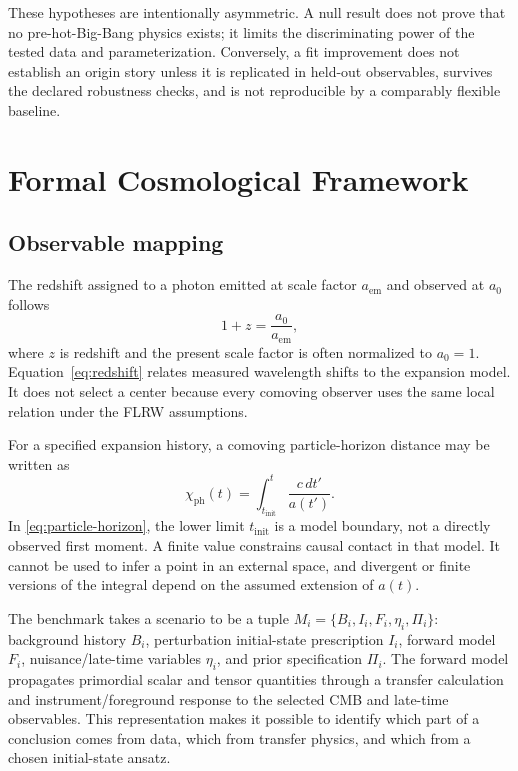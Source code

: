 \documentclass[10pt,conference]{IEEEtran}
\begin{document}
These hypotheses are intentionally asymmetric. A null result does not prove that no pre-hot-Big-Bang physics exists; it limits the discriminating power of the tested data and parameterization. Conversely, a fit improvement does not establish an origin story unless it is replicated in held-out observables, survives the declared robustness checks, and is not reproducible by a comparably flexible baseline.

\section{Formal Cosmological Framework}
\label{sec:framework}

\subsection{Observable mapping}

The redshift assigned to a photon emitted at scale factor $a_{\mathrm{em}}$ and observed at $a_0$ follows
\begin{equation}
1+z=\frac{a_0}{a_{\mathrm{em}}},
\label{eq:redshift}
\end{equation}
where $z$ is redshift and the present scale factor is often normalized to $a_0=1$. Equation~\eqref{eq:redshift} relates measured wavelength shifts to the expansion model. It does not select a center because every comoving observer uses the same local relation under the FLRW assumptions.

For a specified expansion history, a comoving particle-horizon distance may be written as
\begin{equation}
\chi_{\mathrm{ph}}(t)=\int_{t_{\mathrm{init}}}^{t}\frac{c\,dt'}{a(t')}.
\label{eq:particle-horizon}
\end{equation}
In \eqref{eq:particle-horizon}, the lower limit $t_{\mathrm{init}}$ is a model boundary, not a directly observed first moment. A finite value constrains causal contact in that model. It cannot be used to infer a point in an external space, and divergent or finite versions of the integral depend on the assumed extension of $a(t)$.

The benchmark takes a scenario to be a tuple $M_i=\{B_i,I_i,F_i,\eta_i,\Pi_i\}$: background history $B_i$, perturbation initial-state prescription $I_i$, forward model $F_i$, nuisance/late-time variables $\eta_i$, and prior specification $\Pi_i$. The forward model propagates primordial scalar and tensor quantities through a transfer calculation and instrument/foreground response to the selected CMB and late-time observables. This representation makes it possible to identify which part of a conclusion comes from data, which from transfer physics, and which from a chosen initial-state ansatz.
\end{document}
